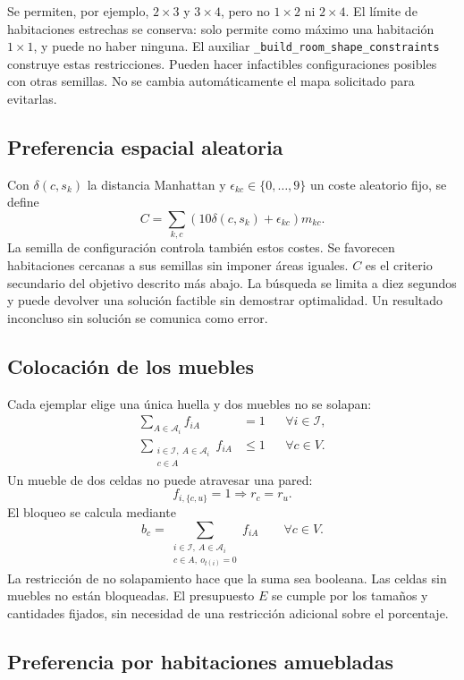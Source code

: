 \documentclass[11pt,a4paper]{article}
\begin{document}
Se permiten, por ejemplo, $2\times3$ y $3\times4$, pero no
$1\times2$ ni $2\times4$. El l\'imite de habitaciones estrechas
se conserva: solo permite como m\'aximo una habitaci\'on $1\times1$,
y puede no haber ninguna.
El auxiliar \texttt{\_build\_room\_shape\_constraints} construye
estas restricciones. Pueden hacer infactibles configuraciones
posibles con otras semillas.
No se cambia autom\'aticamente el mapa solicitado para evitarlas.

\subsection{Preferencia espacial aleatoria}

Con $\delta(c,s_k)$ la distancia Manhattan y
$\epsilon_{kc}\in\{0,\ldots,9\}$ un coste aleatorio fijo, se define
\[
 C=\sum_{k,c}(10\delta(c,s_k)+\epsilon_{kc})m_{kc}.
\]
La semilla de configuraci\'on controla tambi\'en estos costes.
Se favorecen habitaciones cercanas a sus semillas sin imponer
\'areas iguales. $C$ es el criterio secundario del objetivo descrito
m\'as abajo. La b\'usqueda se limita a diez segundos y puede
devolver una soluci\'on factible sin demostrar optimalidad.
Un resultado inconcluso sin soluci\'on se comunica como error.

\subsection{Colocaci\'on de los muebles}

Cada ejemplar elige una \'unica huella y dos muebles no se solapan:
\begin{align}
 \sum_{A\in\mathcal A_i}f_{iA}&=1 &&\forall i\in\mathcal I,\\
 \sum_{\substack{i\in\mathcal I,\ A\in\mathcal A_i\\c\in A}}f_{iA}
     &\leq 1 &&\forall c\in V.
\end{align}
Un mueble de dos celdas no puede atravesar una pared:
\[
 f_{i,\{c,u\}}=1\Longrightarrow r_c=r_u.
\]
El bloqueo se calcula mediante
\[
 b_c=
 \sum_{\substack{i\in\mathcal I,\ A\in\mathcal A_i\\
                   c\in A,\ o_{t(i)}=0}}f_{iA}
 \qquad\forall c\in V.
\]
La restricci\'on de no solapamiento hace que la suma sea booleana.
Las celdas sin muebles no est\'an bloqueadas. El presupuesto $E$ se
cumple por los tama\~nos y cantidades fijados, sin necesidad de una
restricci\'on adicional sobre el porcentaje.

\subsection{Preferencia por habitaciones amuebladas}
\end{document}
